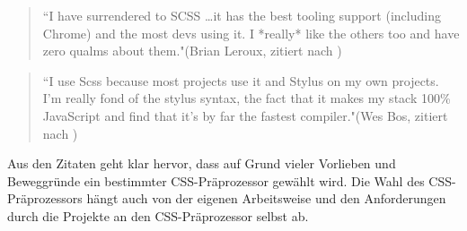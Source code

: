 \begin{quote}
``I have surrendered to SCSS …it has the best tooling support (including Chrome) and the most devs using it. I *really* like the others too and have zero qualms about them."(Brian Leroux, zitiert nach \cite[]{psdtowp.2014})
\end{quote} 
\begin{quote}
``I use Scss because most projects use it and Stylus on my own projects. I'm really fond of the stylus syntax, the fact that it makes my stack 100\% JavaScript and find that it's by far the fastest compiler."(Wes Bos, zitiert nach \cite[]{psdtowp.2014})
\end{quote} 
Aus den Zitaten geht klar hervor, dass auf Grund vieler Vorlieben und Beweggründe ein bestimmter CSS-Präprozessor gewählt wird. \newline
Die Wahl des CSS-Präprozessors hängt auch von der eigenen Arbeitsweise und den Anforderungen durch die Projekte an den CSS-Präprozessor selbst ab.\newline

